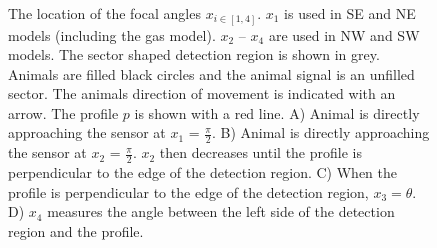 \begin{figure}[t]
  \centering
{
  
}
\caption[The location of the focal angles $x_{i\in[1,4]}$]{
The location of the focal angles $x_{i\in[1,4]}$.
$x_1$ is used in SE and NE models (including the gas model).
$x_2$ -- $x_4$ are used in NW and SW models.
The sector shaped detection region is shown in grey.
Animals are filled black circles and the animal signal is an unfilled sector.
The animals direction of movement is indicated with an arrow.
The profile $p$ is shown with a red line.
A) Animal is directly approaching the sensor at $x_1$ = $\frac{\pi}{2}$.
B) Animal is directly approaching the sensor at $x_2$ = $\frac{\pi}{2}$.
$x_2$ then decreases until the profile is perpendicular to the edge of the detection region.
C) When the profile is perpendicular to the edge of the detection region, $x_3 = \theta$.
D) $x_4$ measures the angle between the left side of the detection region and the profile.}

\label{fig:xis}
\end{figure}




